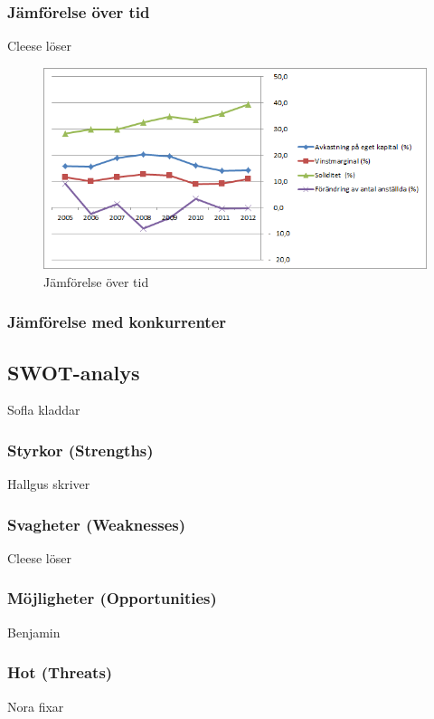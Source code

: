 \documentclass[10pt,a4paper]{article}
\begin{document}
\subsubsection{Jämförelse över tid}
Cleese löser
\begin{figure}[H] 
\centerline{\includegraphics[scale=0.8]{Bilder/jamforelse_over_tid.png}}
\caption{Jämförelse över tid}
\end{figure}  

\subsubsection{Jämförelse med konkurrenter}

\subsection{SWOT-analys}
Sofla kladdar

\subsubsection{Styrkor (Strengths)}
Hallgus skriver

\subsubsection{Svagheter (Weaknesses)}
Cleese löser

\subsubsection{Möjligheter (Opportunities)}
Benjamin

\subsubsection{Hot (Threats)}
Nora fixar
\end{document}
